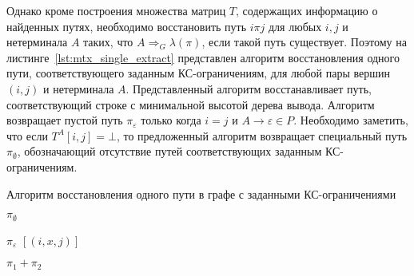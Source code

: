 Однако кроме построения множества матриц $T$, содержащих информацию о найденных путях, необходимо восстановить путь $i \pi j$ для любых $i, j$ и нетерминала $A$ таких, что $A \Rightarrow_G \lambda(\pi)$, если такой путь существует. Поэтому на листинге~\ref{lst:mtx_single_extract} представлен алгоритм восстановления одного пути, соответствующего заданным КС-ограничениям, для любой пары вершин $(i, j)$ и нетерминала $A$. Представленный алгоритм восстанавливает путь, соответствующий строке с минимальной высотой дерева вывода. Алгоритм возвращает пустой путь $\pi_{\varepsilon}$ только когда $i = j$ и $A \to \varepsilon \in P$. Необходимо заметить, что если $T^A[i, j] = \bot$, то предложенный алгоритм возвращает специальный путь $\pi_{\emptyset}$, обозначающий отсутствие путей соответствующих заданным КС-ограничениям.

	\begin{algorithm}
		\begin{algorithmic}[1]
			\caption{Алгоритм восстановления одного пути в графе с заданными КС-ограничениями}
			\label{lst:mtx_single_extract}
			
			\State \Return $\pi_{\emptyset}$
			\EndIf
			
			\State \Return $\pi_{\varepsilon}$
			\EndIf
			\State \Return $[(i,x,j)]$
			\EndIf
			\EndFor
			\EndIf
			
			
						
			\State \Return $\pi_1 + \pi_2$
			\EndIf
			\EndIf
			\EndFor
			\EndFunction
		\end{algorithmic}
	\end{algorithm}
	
